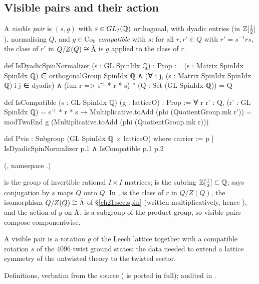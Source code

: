 \subsection{Visible pairs and their action}

\begin{definition}\label{ch21:def:Pvis}
A \emph{visible pair} is $(s,g)$ with $s\in GL_I({\mathbb{Q}})$ orthogonal, with dyadic entries (in ${\mathbb{Z}}[\tfrac12]$),
normalising $Q$, and $g\in\mathrm{Co}_0$ \emph{compatible} with $s$: for all $r,r'\in Q$ with
$r'=s^{-1}rs$, the class of $r'$ in $Q/Z(Q)\cong\bar{\Lambda}$ is $g$ applied to the class of $r$.
\end{definition}
\begin{leancode}
def IsDyadicSpinNormalizer (s : GL SpinIdx ℚ) : Prop :=
  (s : Matrix SpinIdx SpinIdx ℚ) ∈ orthogonalGroup SpinIdx ℚ ∧
    (∀ i j, (s : Matrix SpinIdx SpinIdx ℚ) i j ∈ dyadic) ∧
    (fun r => s⁻¹ * r * s) '' (Q : Set (GL SpinIdx ℚ)) = Q
\end{leancode}
\begin{leancode}
def IsCompatible (s : GL SpinIdx ℚ) (g : latticeO) : Prop :=
  ∀ r r' : Q, (r' : GL SpinIdx ℚ) = s⁻¹ * r * s →
    Multiplicative.toAdd (phi (QuotientGroup.mk r')) =
      modTwoEnd g (Multiplicative.toAdd (phi (QuotientGroup.mk r)))
\end{leancode}
\begin{leancode}
def Pvis : Subgroup (GL SpinIdx ℚ × latticeO) where
  carrier := {p | IsDyadicSpinNormalizer p.1 ∧ IsCompatible p.1 p.2}
\end{leancode}
(, namespace .)
\begin{dictionary}
 is the group of invertible rational $I\times I$ matrices;  is the subring
${\mathbb{Z}}[\tfrac12]\subset{\mathbb{Q}}$;  says conjugation by $s$ maps $Q$ onto $Q$.
In ,  is the class of $r$ in $Q/Z(Q)$,  the
isomorphism $Q/Z(Q)\cong\bar{\Lambda}$ of \S\ref{ch21:sec:spin} (written multiplicatively, hence
), and  the action of $g$ on $\bar{\Lambda}$.   is a
subgroup of the product group, so visible pairs compose componentwise.
\end{dictionary}
\begin{physics}
A visible pair is a rotation $g$ of the Leech lattice together with a compatible rotation $s$ of the
$4096$ twist ground states: the data needed to extend a lattice symmetry of the untwisted theory to the
twisted sector.
\end{physics}
\begin{status}
Definitions, verbatim from the source ( is ported in full); 
audited in .
\end{status}

